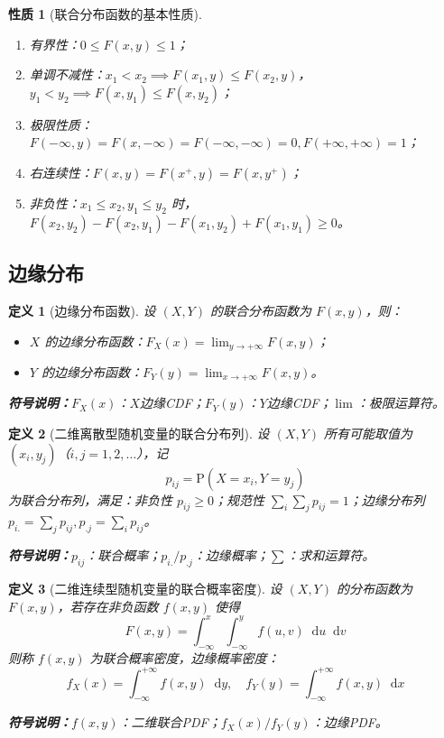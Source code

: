 \documentclass{article}
\newcommand{\Prob}{\mathrm{P}}
\newcommand{\dif}{\mathop{}\!\mathrm{d}}
\newcommand{\symnote}[1]{\par\noindent\textbf{符号说明：}#1\par}
\theoremstyle{mytheorem}
\newtheorem{definition}{定义}[section]
\newtheorem{property}{性质}[section]
\begin{document}
\begin{property}[联合分布函数的基本性质]
\begin{enumerate}
    \item 有界性：$0 \le F(x,y) \le 1$；
    \item 单调不减性：$x_1 < x_2 \implies F(x_1,y) \le F(x_2,y)$，$y_1 < y_2 \implies F(x,y_1) \le F(x,y_2)$；
    \item 极限性质：$F(-\infty,y)=F(x,-\infty)=F(-\infty,-\infty)=0, F(+\infty,+\infty)=1$；
    \item 右连续性：$F(x,y) = F(x^+,y) = F(x,y^+)$；
    \item 非负性：$x_1 \le x_2, y_1 \le y_2$ 时，$F(x_2,y_2) - F(x_2,y_1) - F(x_1,y_2) + F(x_1,y_1) \ge 0$。
\end{enumerate}
\end{property}

\subsection{边缘分布}
\begin{definition}[边缘分布函数]
设 $(X,Y)$ 的联合分布函数为 $F(x,y)$，则：
\begin{itemize}
    \item $X$ 的边缘分布函数：$F_X(x) = \lim_{y \to +\infty} F(x,y)$；
    \item $Y$ 的边缘分布函数：$F_Y(y) = \lim_{x \to +\infty} F(x,y)$。
\end{itemize}
\symnote{$F_X(x)$：$X$边缘CDF；$F_Y(y)$：$Y$边缘CDF；$\lim$：极限运算符。}
\end{definition}

\begin{definition}[二维离散型随机变量的联合分布列]
设 $(X,Y)$ 所有可能取值为 $(x_i, y_j)$（$i,j=1,2,\dots$），记
$$
p_{ij} = \Prob(X = x_i, Y = y_j)
$$
为联合分布列，满足：非负性 $p_{ij} \ge 0$；规范性 $\sum_i \sum_j p_{ij} = 1$；边缘分布列 $p_{i.} = \sum_j p_{ij}, p_{.j} = \sum_i p_{ij}$。
\symnote{$p_{ij}$：联合概率；$p_{i.}/p_{.j}$：边缘概率；$\sum$：求和运算符。}
\end{definition}

\begin{definition}[二维连续型随机变量的联合概率密度]
设 $(X,Y)$ 的分布函数为 $F(x,y)$，若存在非负函数 $f(x,y)$ 使得
$$
F(x,y) = \int_{-\infty}^x \int_{-\infty}^y f(u,v)\dif u\dif v
$$
则称 $f(x,y)$ 为联合概率密度，边缘概率密度：
$$
f_X(x) = \int_{-\infty}^{+\infty} f(x,y)\dif y, \quad f_Y(y) = \int_{-\infty}^{+\infty} f(x,y)\dif x
$$
\symnote{$f(x,y)$：二维联合PDF；$f_X(x)/f_Y(y)$：边缘PDF。}
\end{definition}
\end{document}
